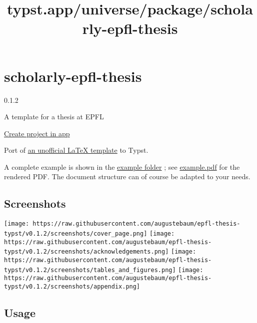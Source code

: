 \title{typst.app/universe/package/scholarly-epfl-thesis}

\label{banner}
\label{template-thumbnail}

\section{scholarly-epfl-thesis}\label{scholarly-epfl-thesis}

{ 0.1.2 }

A template for a thesis at EPFL

\href{/app?template=scholarly-epfl-thesis&version=0.1.2}{Create project
in app}

\label{readme}
Port of
\href{https://www.overleaf.com/latex/templates/swiss-federal-institute-of-technology-in-lausanne-epfl-phd-thesis/dhcgtppybcwv}{an
unofficial LaTeX template} to Typst.

A complete example is shown in the
\href{https://github.com/augustebaum/epfl-thesis-typst/blob/v0.1.2/example}{example
folder} ; see
\href{https://github.com/augustebaum/epfl-thesis-typst/blob/v0.1.2/example/main.pdf}{example.pdf}
for the rendered PDF. The document structure can of course be adapted to
your needs.

\subsection{Screenshots}\label{screenshots}

\texttt{[image: https://raw.githubusercontent.com/augustebaum/epfl-thesis-typst/v0.1.2/screenshots/cover\_page.png]}
\texttt{[image: https://raw.githubusercontent.com/augustebaum/epfl-thesis-typst/v0.1.2/screenshots/acknowledgements.png]}
\texttt{[image: https://raw.githubusercontent.com/augustebaum/epfl-thesis-typst/v0.1.2/screenshots/tables\_and\_figures.png]}
\texttt{[image: https://raw.githubusercontent.com/augustebaum/epfl-thesis-typst/v0.1.2/screenshots/appendix.png]}

\subsection{Usage}\label{usage}

